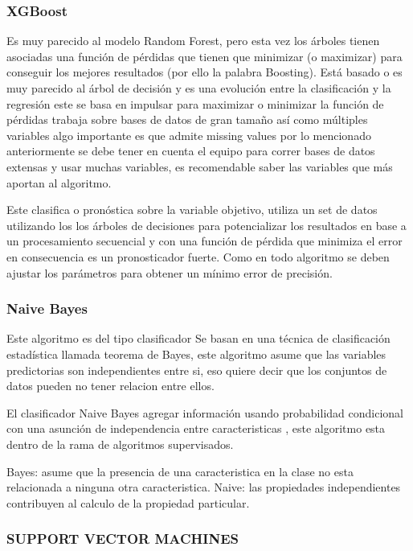 \subsubsection{XGBoost}
Es muy parecido al modelo Random Forest, pero esta vez los \'arboles tienen asociadas una funci\'on de p\'erdidas que tienen que minimizar (o maximizar) para conseguir los mejores resultados (por ello la palabra Boosting).
Est\'a basado o es muy parecido al \'arbol de decisi\'on y es una evoluci\'on entre la clasificaci\'on y la regresi\'on  este se basa en impulsar  para maximizar o minimizar la funci\'on de p\'erdidas trabaja sobre bases de datos de gran tamaño as\'i como m\'ultiples variables algo importante es que admite missing values  por lo mencionado anteriormente se debe tener en cuenta el equipo para  correr bases de datos extensas y usar muchas variables, es recomendable saber las variables que m\'as aportan al algoritmo.

Este clasifica o pron\'ostica sobre la variable objetivo, utiliza un set de datos utilizando los los \'arboles de decisiones para potencializar los resultados en base a un procesamiento secuencial y con una funci\'on de p\'erdida  que minimiza el error en consecuencia es un pronosticador fuerte. Como en todo algoritmo se deben ajustar los par\'ametros para obtener un m\'inimo error de precisi\'on.

\subsubsection{Naive Bayes}
Este algoritmo es del tipo clasificador Se basan en una t\'ecnica de clasificaci\'on estadística llamada teorema de Bayes, este algoritmo asume que las variables predictorias son independientes entre si, eso quiere decir que los conjuntos de datos pueden no tener relacion entre ellos.

El clasificador Naive Bayes agregar informaci\'on usando probabilidad condicional con una asunci\'on de independencia entre caracteristicas , este algoritmo esta dentro de la rama de algoritmos supervisados.

Bayes: asume que la presencia de una caracteristica en la clase no esta relacionada a ninguna otra caracteristica.
Naive: las propiedades independientes contribuyen al calculo de la propiedad particular.

\subsubsection{SUPPORT VECTOR MACHINES}

